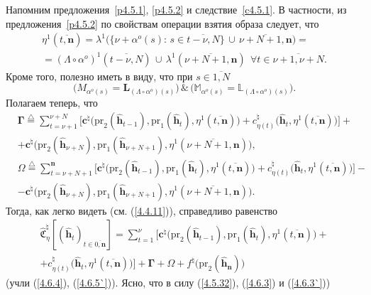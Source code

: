 \documentclass[11pt,twoside,openany]{report}
\newcommand{\df}{\stackrel{\triangle}{=}}
\newcommand{\ov}{\overline}
\newcommand{\La}{\Lambda}
\newcommand{\la}{\lambda}
\newcommand{\al}{\alpha}
\newcommand{\fa}{\forall}
\newcommand{\bbl}{{\mathbb L}}
\newcommand{\bbm}{{\mathbb M}}
\newcommand{\zc}{{\mathbf c}}
\newcommand{\nn}{{\mathbf n}}
\begin{document}
{{Напомним предложения~\ref{p4.5.1}, \ref{p4.5.2} и следствие~\ref{c4.5.1}. В частности,
из предложения~\ref{p4.5.2}  по свойствам операции взятия образа следует, что
\begin{eqnarray}
&\eta^1(\ov{t,\mathbf{n}}) = \la^1\bigl(\{\nu+\al^o(s):\,s\in \ov{t-\nu,N}\}\,\cup\,
\ov{\nu+N+1,\nn}\bigl) =
&\nonumber\\
&= (\La \circ\al^o)^1(\ov{t-\nu,N})\,\cup\, \la^1(\ov{\nu+N+1,\nn})\ \ \fa t\in \ov{\nu+1,\nu+N}.
&\label{4.6.3`}
\end{eqnarray}
Кроме того, полезно иметь в виду, что при $s\in \ov{1,N}$
$$\bigl(M_{\al^o(s)} = \mathbf{L}_{(\La\circ \al^o)(s)}\bigl)\,\&\,\bigl(\bbm_{\al^o(s)} =
\bbl_{(\La\circ \al^o)(s)}\bigl).
$$
Полагаем теперь, что \cite[(5.10), (5.11)]{Cha13`}
\begin{eqnarray}
&\mathbf{\Gamma}\df \sum\limits_{t=\nu+1}^{\nu+N}
\bigl[\zc^\natural\bigl(\mathrm{pr}_2(\hat{\mathbf{h}}_{t-1}),\mathrm{pr}_1(\hat{\mathbf{h}}_t),
\eta^1(\ov{t,\nn})\bigl) + c_{\eta(t)}^\natural\bigl(\hat{\mathbf{h}}_t,\eta^1(\ov{t,\nn})\bigl)\bigl] +
&\nonumber\\
&+\zc^\natural\bigl(\mathrm{pr}_2(\hat{\mathbf{h}}_{\nu+N}),\mathrm{pr}_1
(\hat{\mathbf{h}}_{\nu+N+1}),\eta^1(\ov{\nu+N+1,\nn})\bigl),
&\label{4.6.4}
\end{eqnarray}
\begin{eqnarray}
&\Omega\df \sum\limits_{t=\nu+N+1}^\nn \bigl[\zc^\natural\bigl(\mathrm{pr}_2(\hat{\mathbf{h}}_{t-1}),
\mathrm{pr}_1(\hat{\mathbf{h}}_t),
\eta^1(\ov{t,\nn})\bigl) + c_{\eta(t)}^\natural\bigl(\hat{\mathbf{h}}_t,\eta^1(\ov{t,\nn})\bigl)\bigl] -
&\nonumber\\
&- \zc^\natural\bigl(\mathrm{pr}_2(\hat{\mathbf{h}}_{\nu+N}),\mathrm{pr}_1
(\hat{\mathbf{h}}_{\nu+N+1}),\eta^1(\ov{\nu+N+1,\nn})\bigl).
&\label{4.6.5`}
\end{eqnarray}
Тогда, как легко видеть (см. (\ref{4.4.11})), справедливо равенство
$$
\begin{array}{c}
\widehat{\mathfrak{C}}_\eta^\natural[(\hat{\mathbf{h}}_t)_{t\in\ov{0,\nn}}]=
\sum\limits_{t=1}^\nu \bigl[\zc^\natural\bigl(\mathrm{pr}_2(\hat{\mathbf{h}}_{t-1}),
\mathrm{pr}_1(\hat{\mathbf{h}}_t),
\eta^1(\ov{t,\nn})\bigl) +
\\
+c_{\eta(t)}^\natural\bigl(\hat{\mathbf{h}}_t,\eta^1(\ov{t,\nn})\bigl)\bigl]
+\mathbf{\Gamma} + \Omega +f^\natural\bigl(\mathrm{pr}_2(\hat{\mathbf{h}}_\nn)\bigl)
\end{array}
$$
(учли (\ref{4.6.4}), (\ref{4.6.5`})). Ясно, что в силу (\ref{4.5.32}), (\ref{4.6.3}) и (\ref{4.6.3`}))
}}
\end{document}
